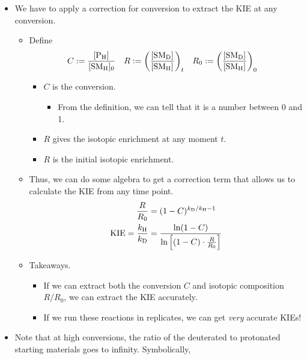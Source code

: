 \documentclass[../notes.tex]{subfiles}
\begin{document}
\begin{itemize}
\begin{itemize}
\begin{itemize}
        \end{itemize}
    \end{itemize}
    \item We have to apply a correction for conversion to extract the KIE at any conversion.
    \begin{itemize}
        \item Define
        \begin{align*}
            C &:= \frac{\cnc{P_H}}{\cnc[0]{SM_H}}&
            R &:= \left( \frac{\cnc{SM_D}}{\cnc{SM_H}} \right)_t&
            R_0 &:= \left( \frac{\cnc{SM_D}}{\cnc{SM_H}} \right)_0
        \end{align*}
        \begin{itemize}
            \item $C$ is the conversion.
            \begin{itemize}
                \item From the definition, we can tell that it is a number between 0 and 1.
            \end{itemize}
            \item $R$ gives the isotopic enrichment at any moment $t$.
            \item $R$ is the initial isotopic enrichment.
        \end{itemize}
        \item Thus, we can do some algebra to get a correction term that allows us to calculate the KIE from any time point.
        \begin{align*}
            \frac{R}{R_0} &= (1-C)^{k_{\ce{D}}/k_{\ce{H}}-1}\\
            \KIE = \frac{k_{\ce{H}}}{k_{\ce{D}}} &= \frac{\ln(1-C)}{\ln\left[ (1-C)\cdot\frac{R}{R_0} \right]}
        \end{align*}
        \item Takeaways.
        \begin{itemize}
            \item If we can extract both the conversion $C$ and isotopic composition $R/R_0$, we can extract the KIE accurately.
            \item If we run these reactions in replicates, we can get \emph{very} accurate KIEs!
        \end{itemize}
    \end{itemize}
    \item Note that at high conversions, the ratio of the deuterated to protonated starting materials goes to infinity. Symbolically,
    \begin{equation*}

\end{equation*}
\end{itemize}
\end{document}
